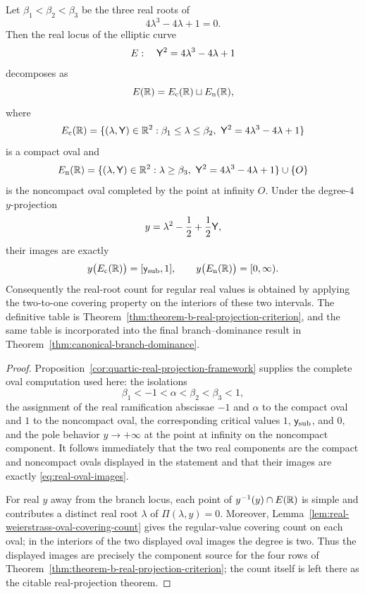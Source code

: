 \begin{corollary}\label{cor:real-root-interval-diagram}
Let $\beta_1 < \beta_2 < \beta_3$ be the three real roots of
\[
4\lambda^3 - 4\lambda + 1 = 0.
\]
Then the real locus of the elliptic curve
\[
E:\quad \mathsf{Y}^2 = 4\lambda^3 - 4\lambda + 1
\]
decomposes as
\[
E(\mathbb{R})=E_{\mathrm{c}}(\mathbb{R})\sqcup E_{\mathrm{n}}(\mathbb{R}),
\]
where
\[
E_{\mathrm{c}}(\RR)
=\{(\lambda,\WeierY)\in\RR^2:\beta_1\le \lambda\le \beta_2,\ \WeierY^2=4\lambda^3-4\lambda+1\}
\]
is a compact oval and
\[
E_{\mathrm{n}}(\RR)
=\{(\lambda,\WeierY)\in\RR^2:\lambda\ge \beta_3,\ \WeierY^2=4\lambda^3-4\lambda+1\}\cup\{O\}
\]
is the noncompact oval completed by the point at infinity $O$.
Under the degree-$4$ \(y\)-projection
\[
y=\lambda^2-\frac12+\frac12\mathsf{Y},
\]
their images are exactly
\begin{equation}\label{eq:real-oval-images}
y\bigl(E_{\mathrm{c}}(\mathbb{R})\bigr)=[\mathsf{y}_{\mathrm{sub}},1],
\qquad
y\bigl(E_{\mathrm{n}}(\mathbb{R})\bigr)=[0,\infty).
\end{equation}
Consequently the real-root count for regular real values is obtained by applying the two-to-one covering property on the interiors of these two intervals.
The definitive table is Theorem~\ref{thm:theorem-b-real-projection-criterion}, and the same table is incorporated into the final branch--dominance result in Theorem~\ref{thm:canonical-branch-dominance}.
\end{corollary}

\begin{proof}
Proposition~\ref{cor:quartic-real-projection-framework} supplies the complete oval computation used here: the isolations
\[
\beta_1<-1<\alpha<\beta_2<\beta_3<1,
\]
the assignment of the real ramification abscissae $-1$ and $\alpha$ to the compact oval and $1$ to the noncompact oval, the corresponding critical values $1$, $\mathsf{y}_{\mathrm{sub}}$, and $0$, and the pole behavior $y\to+\infty$ at the point at infinity on the noncompact component.
It follows immediately that the two real components are the compact and noncompact ovals displayed in the statement and that their images are exactly \eqref{eq:real-oval-images}.

For real $y$ away from the branch locus, each point of $y^{-1}(y)\cap E(\mathbb{R})$ is simple and contributes a distinct real root $\lambda$ of $\Pi(\lambda,y)=0$.
Moreover, Lemma~\ref{lem:real-weierstrass-oval-covering-count} gives the regular-value covering count on each oval; in the interiors of the two displayed oval images the degree is two.
Thus the displayed images are precisely the component source for the four rows of Theorem~\ref{thm:theorem-b-real-projection-criterion}; the count itself is left there as the citable real-projection theorem.
\end{proof}

